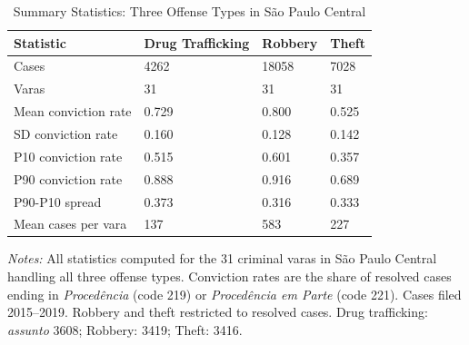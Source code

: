 \begin{table}[!h]
\centering
\caption{\label{tab:summary}Summary Statistics: Three Offense Types in S\~ao Paulo Central}
\centering
\begin{tabular}[t]{llll}
\toprule
Statistic & Drug Trafficking & Robbery & Theft\\
\midrule
Cases & 4262 & 18058 & 7028\\
Varas & 31 & 31 & 31\\
Mean conviction rate & 0.729 & 0.800 & 0.525\\
SD conviction rate & 0.160 & 0.128 & 0.142\\
P10 conviction rate & 0.515 & 0.601 & 0.357\\
\addlinespace
P90 conviction rate & 0.888 & 0.916 & 0.689\\
P90-P10 spread & 0.373 & 0.316 & 0.333\\
Mean cases per vara & 137 & 583 & 227\\
\bottomrule
\end{tabular}
\end{table}
\begin{flushleft}\small
\textit{Notes:} All statistics computed for the 31 criminal varas in S\~ao Paulo Central handling all three offense types. Conviction rates are the share of resolved cases ending in \textit{Proced\^encia} (code 219) or \textit{Proced\^encia em Parte} (code 221). Cases filed 2015--2019. Robbery and theft restricted to resolved cases. Drug trafficking: \textit{assunto} 3608; Robbery: 3419; Theft: 3416.
\end{flushleft}
